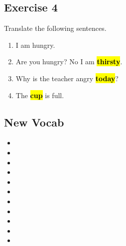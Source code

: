 \subsection{Exercise 4}
Translate the following sentences. 
\begin{enumerate}
    \item I am hungry.  \\[0.1in] \answerline 
    \item Are you hungry? No I am \hl{\textbf{thirsty}}. \\[0.1in] \answerline 
    \item Why is the teacher angry \hl{\textbf{today}}?  \\[0.1in] \answerline 
    \item The \hl{\textbf{cup}} is full. \\[0.1in] \answerline 
\end{enumerate}


\subsection{New Vocab}
\begin{itemize}
    \item {}
    \item {}
    \item {}
    \item {}
    \item {}
    \item {}
    \item {}
    \item {}
    \item {}
    \item {}
    \item {}
\end{itemize}